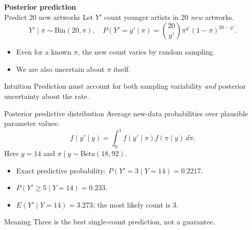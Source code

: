 \documentclass[aspectratio=43]{beamer}
\begin{document}
\begin{frame}{\textbf{Posterior prediction}\\Predict 20 new artworks}
Let $Y'$ count younger artists in 20 \emph{new} artworks.
\[
Y'\mid\pi\sim\mathrm{Bin}(20,\pi),\quad
P(Y'=y'\mid\pi)={20\choose y'}\pi^{y'}(1-\pi)^{20-y'}.
\]
\begin{itemize}
\item Even for a known $\pi$, the new count varies by random sampling.
\item We are also uncertain about $\pi$ itself.
\end{itemize}
\begin{block}{Intuition}
Prediction must account for both sampling variability \emph{and} posterior uncertainty about the rate.
\end{block}
\end{frame}
\begin{frame}{Posterior predictive distribution}
Average new-data probabilities over plausible parameter values:
\[
f(y'\mid y)=\int_0^1 f(y'\mid\pi)f(\pi\mid y)\,d\pi.
\]
Here $y=14$ and $\pi\mid y\sim\mathrm{Beta}(18,92)$.
\begin{itemize}
\item Exact predictive probability: $P(Y'=3\mid Y=14)=0.2217$.
\item $P(Y'\ge5\mid Y=14)=0.233$.
\item $E(Y'\mid Y=14)=3.273$; the most likely count is 3.
\end{itemize}
\begin{block}{Meaning}
Three is the best single-count prediction, not a guarantee.
\end{block}
\end{frame}
\end{document}
